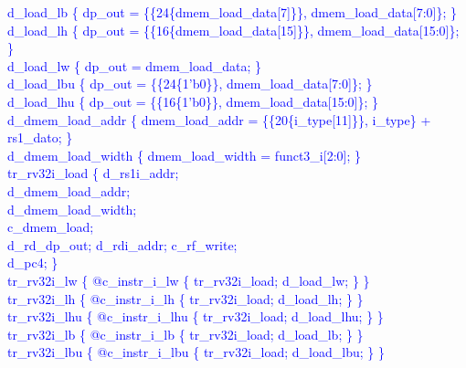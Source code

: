 \textcolor{blue}{
   d\_load\_lb \{ dp\_out = \{\{24\{dmem\_load\_data[7]\}\}, dmem\_load\_data[7:0]\}; \}\\%
\indent d\_load\_lh \{ dp\_out = \{\{16\{dmem\_load\_data[15]\}\},  dmem\_load\_data[15:0]\}; \}\\%
\indent d\_load\_lw \{ dp\_out = dmem\_load\_data; \}\\%
\indent d\_load\_lbu \{ dp\_out = \{\{24\{1'b0\}\}, dmem\_load\_data[7:0]\}; \}\\%
\indent d\_load\_lhu \{ dp\_out = \{\{16\{1'b0\}\}, dmem\_load\_data[15:0]\}; \}\\%
\indent d\_dmem\_load\_addr \{ dmem\_load\_addr = \{\{20\{i\_type[11]\}\}, i\_type\} + rs1\_dato; \}\\%
\indent d\_dmem\_load\_width \{ dmem\_load\_width = funct3\_i[2:0]; \}\\%
\indent tr\_rv32i\_load \{ d\_rs1i\_addr; \\%
\indent \hspace{\parindent} d\_dmem\_load\_addr; \\%
\indent \hspace{\parindent} d\_dmem\_load\_width; \\%
\indent \hspace{\parindent} c\_dmem\_load; \\%
\indent \hspace{\parindent} d\_rd\_dp\_out; d\_rdi\_addr; c\_rf\_write; \\%
\indent \hspace{\parindent} d\_pc4; \} \\%
\indent tr\_rv32i\_lw \{ @c\_instr\_i\_lw \{ tr\_rv32i\_load; d\_load\_lw; \} \} \\%
\indent tr\_rv32i\_lh \{ @c\_instr\_i\_lh \{ tr\_rv32i\_load; d\_load\_lh; \} \} \\%
\indent tr\_rv32i\_lhu \{ @c\_instr\_i\_lhu \{ tr\_rv32i\_load; d\_load\_lhu; \} \} \\%
\indent tr\_rv32i\_lb \{ @c\_instr\_i\_lb \{ tr\_rv32i\_load; d\_load\_lb; \} \} \\%
\indent tr\_rv32i\_lbu \{ @c\_instr\_i\_lbu \{ tr\_rv32i\_load; d\_load\_lbu; \} \} \\%
}

